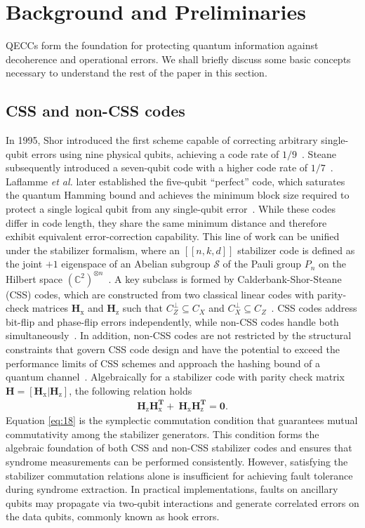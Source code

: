 \documentclass[reprint, amsmath,amssymb, aps,pra,
 floatfix,
]{revtex4-2}
\begin{document}
\section{Background and Preliminaries}
\label{sec:Preliminaries}
\noindent QECCs form the foundation for protecting quantum information against decoherence and operational errors.
We shall briefly discuss some basic concepts necessary to understand the rest of the paper in this section.
\subsection{CSS and non-CSS codes}

\noindent In 1995, Shor introduced the first scheme capable of correcting arbitrary single-qubit errors using nine physical qubits, achieving a code rate of $1/9$~\cite{shor9qubit1995}.
Steane subsequently introduced a seven-qubit code with a higher code rate of $1/7$~\cite{steane1996}.
Laflamme \emph{et al.} later established the five-qubit ``perfect'' code, which saturates the quantum Hamming bound and achieves the minimum block size required to protect a single logical qubit from any single-qubit error~\cite{laflamme1996perfect}.
While these codes differ in code length, they share the same minimum distance and therefore exhibit equivalent error-correction capability.
This line of work can be unified under the stabilizer formalism, where an $[[ n,k,d]]$ stabilizer code is defined as the joint $+1$ eigenspace of an Abelian subgroup $ \mathcal{S}$ of the Pauli group $P_n$ on the Hilbert space $(\mathbb{C}^2)^{\otimes n}$~\cite{gottesman1997stabilizercodesquantumerror}.
A key subclass is formed by Calderbank-Shor-Steane (CSS) codes, which are constructed from two classical linear codes with parity-check matrices $\mathbf{H}_\mathrm{x}$ and $\mathbf{H}_\mathrm{z}$ such that $C_Z^\perp \subseteq C_X$ and $C_X^\perp \subseteq C_Z$~\cite{Calderbank_1996}.
CSS codes address bit-flip and phase-flip errors independently, while non-CSS codes handle both simultaneously~\cite{laflamme1996perfect}.
In addition, non-CSS codes are not restricted by the structural constraints that govern CSS code design and have the potential to exceed the performance limits of CSS schemes and approach the hashing bound of a quantum channel~\cite{noncsshashingbound}.
Algebraically for a stabilizer code with parity check matrix $\mathbf{H=[H_\mathrm{x}|H_\mathrm{z}]}$, the following relation holds 
\begin{align}
 \mathbf{H_\mathrm{z} H_\mathrm{x}^T+ \ H_\mathrm{x} H_\mathrm{z}^T = \mathbf{0}}.
  \label{eq:18}
\end{align} 
Equation \ref{eq:18} is the symplectic commutation condition that guarantees mutual commutativity among the stabilizer generators.
This condition forms the algebraic foundation of both CSS and non-CSS stabilizer codes and ensures that syndrome measurements can be performed
consistently.
However, satisfying the stabilizer commutation relations alone is insufficient for achieving fault tolerance during syndrome extraction.
In practical implementations, faults on ancillary qubits may propagate via two-qubit interactions and generate correlated errors on the data qubits, commonly known as hook errors.
\end{document}
